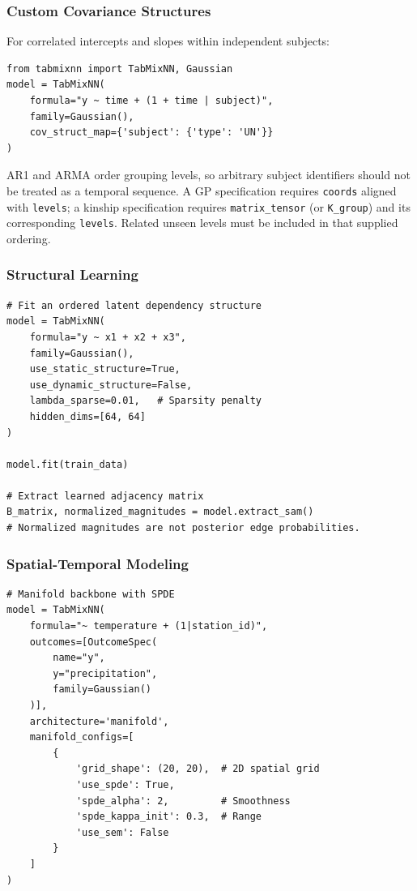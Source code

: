 \documentclass[12pt,a4paper]{article}
\begin{document}
\subsubsection{Custom Covariance Structures}

For correlated intercepts and slopes within independent subjects:
\begin{lstlisting}
from tabmixnn import TabMixNN, Gaussian
model = TabMixNN(
    formula="y ~ time + (1 + time | subject)",
    family=Gaussian(),
    cov_struct_map={'subject': {'type': 'UN'}}
)
\end{lstlisting}

AR1 and ARMA order grouping levels, so arbitrary subject identifiers should not be treated as a temporal sequence. A GP specification requires \texttt{coords} aligned with \texttt{levels}; a kinship specification requires \texttt{matrix\_tensor} (or \texttt{K\_group}) and its corresponding \texttt{levels}. Related unseen levels must be included in that supplied ordering.

\subsubsection{Structural Learning}

\begin{lstlisting}
# Fit an ordered latent dependency structure
model = TabMixNN(
    formula="y ~ x1 + x2 + x3",
    family=Gaussian(),
    use_static_structure=True,
    use_dynamic_structure=False,
    lambda_sparse=0.01,   # Sparsity penalty
    hidden_dims=[64, 64]
)

model.fit(train_data)

# Extract learned adjacency matrix
B_matrix, normalized_magnitudes = model.extract_sam()
# Normalized magnitudes are not posterior edge probabilities.
\end{lstlisting}

\subsubsection{Spatial-Temporal Modeling}

\begin{lstlisting}
# Manifold backbone with SPDE
model = TabMixNN(
    formula="~ temperature + (1|station_id)",
    outcomes=[OutcomeSpec(
        name="y",
        y="precipitation",
        family=Gaussian()
    )],
    architecture='manifold',
    manifold_configs=[
        {
            'grid_shape': (20, 20),  # 2D spatial grid
            'use_spde': True,
            'spde_alpha': 2,         # Smoothness
            'spde_kappa_init': 0.3,  # Range
            'use_sem': False
        }
    ]
)
\end{lstlisting}
\end{document}
